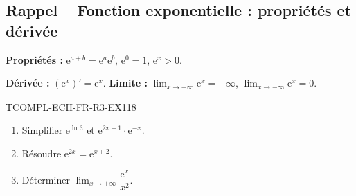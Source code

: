 

\subsection*{Rappel -- Fonction exponentielle : propriétés et dérivée}

\textbf{Propriétés :} $\mathrm{e}^{a+b} = \mathrm{e}^a \mathrm{e}^b$, $\mathrm{e}^0 = 1$, $\mathrm{e}^x > 0$.

\textbf{Dérivée :} $(\mathrm{e}^x)' = \mathrm{e}^x$. \textbf{Limite :} $\lim_{x \to +\infty} \mathrm{e}^x = +\infty$, $\lim_{x \to -\infty} \mathrm{e}^x = 0$.

\begin{exercice}{TCOMPL-ECH-FR-R3-EX1}{1}{8}
\begin{enumerate}
  \item Simplifier $\mathrm{e}^{\ln 3}$ et $\mathrm{e}^{2x + 1} \cdot \mathrm{e}^{-x}$.
  \item Résoudre $\mathrm{e}^{2x} = \mathrm{e}^{x+2}$.
  \item Déterminer $\lim_{x \to +\infty} \dfrac{\mathrm{e}^x}{x^2}$.
\end{enumerate}
\end{exercice}

